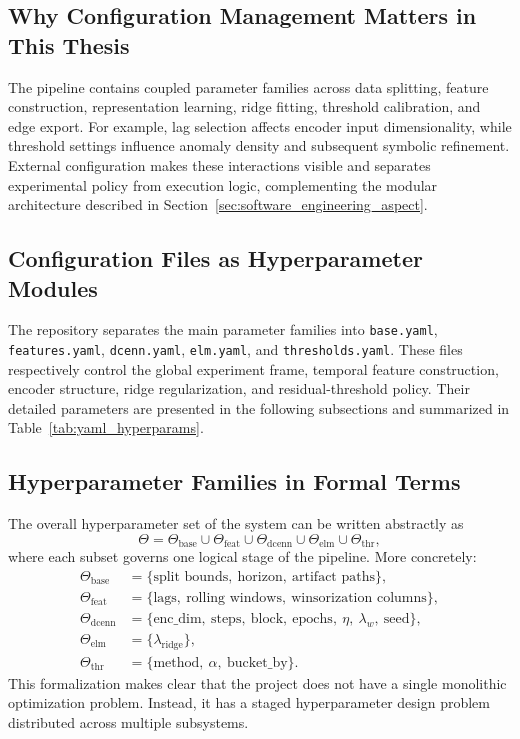 \subsection{Why Configuration Management Matters in This Thesis}

The pipeline contains coupled parameter families across data splitting, feature construction, representation learning, ridge fitting, threshold calibration, and edge export. For example, lag selection affects encoder input dimensionality, while threshold settings influence anomaly density and subsequent symbolic refinement. External configuration makes these interactions visible and separates experimental policy from execution logic, complementing the modular architecture described in Section~\ref{sec:software_engineering_aspect}.

\subsection{Configuration Files as Hyperparameter Modules}

The repository separates the main parameter families into \texttt{base.yaml}, \texttt{features.yaml}, \texttt{dcenn.yaml}, \texttt{elm.yaml}, and \texttt{thresholds.yaml}. These files respectively control the global experiment frame, temporal feature construction, encoder structure, ridge regularization, and residual-threshold policy. Their detailed parameters are presented in the following subsections and summarized in Table~\ref{tab:yaml_hyperparams}.

\subsection{Hyperparameter Families in Formal Terms}

The overall hyperparameter set of the system can be written abstractly as
\begin{equation}
	\Theta =
	\Theta_{\mathrm{base}}
	\cup
	\Theta_{\mathrm{feat}}
	\cup
	\Theta_{\mathrm{dcenn}}
	\cup
	\Theta_{\mathrm{elm}}
	\cup
	\Theta_{\mathrm{thr}},
	\label{eq:theta_union}
\end{equation}
where each subset governs one logical stage of the pipeline. More concretely:
\begin{align}
	\Theta_{\mathrm{base}} &= \{\text{split bounds},\ \text{horizon},\ \text{artifact paths}\}, \\
	\Theta_{\mathrm{feat}} &= \{\text{lags},\ \text{rolling windows},\ \text{winsorization columns}\}, \\
	\Theta_{\mathrm{dcenn}} &= \{\text{enc\_dim},\ \text{steps},\ \text{block},\ \text{epochs},\ \eta,\ \lambda_w,\ \text{seed}\}, \\
	\Theta_{\mathrm{elm}} &= \{\lambda_{\mathrm{ridge}}\}, \\
	\Theta_{\mathrm{thr}} &= \{\text{method},\ \alpha,\ \text{bucket\_by}\}.
	\label{eq:theta_families}
\end{align}
This formalization makes clear that the project does not have a single monolithic optimization problem. Instead, it has a staged hyperparameter design problem distributed across multiple subsystems.

